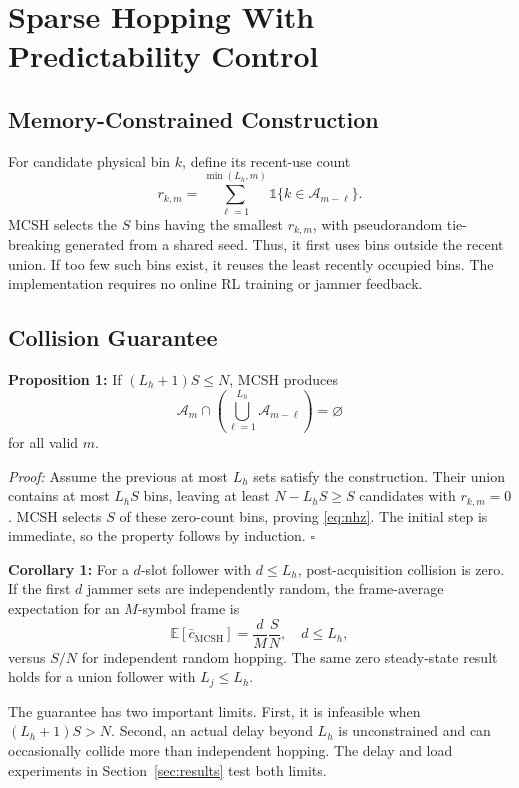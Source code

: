 \documentclass[journal,10pt]{IEEEtran}
\begin{document}
\section{Sparse Hopping With Predictability Control}
\subsection{Memory-Constrained Construction}
For candidate physical bin $k$, define its recent-use count
\begin{equation}
r_{k,m}=\sum_{\ell=1}^{\min(L_h,m)}
\mathds{1}\{k\in\mathcal{A}_{m-\ell}\}.
\label{eq:recent}
\end{equation}
MCSH selects the $S$ bins having the smallest $r_{k,m}$, with pseudorandom
tie-breaking generated from a shared seed. Thus, it first uses bins outside
the recent union. If too few such bins exist, it reuses the least recently
occupied bins. The implementation requires no online RL training or jammer
feedback.

\subsection{Collision Guarantee}
\textbf{Proposition 1:} If $(L_h+1)S\leq N$, MCSH produces
\begin{equation}
\mathcal{A}_m\cap
\left(\bigcup_{\ell=1}^{L_h}\mathcal{A}_{m-\ell}\right)=\varnothing
\label{eq:nhz}
\end{equation}
for all valid $m$.

\emph{Proof:} Assume the previous at most $L_h$ sets satisfy the construction.
Their union contains at most $L_hS$ bins, leaving at least
$N-L_hS\geq S$ candidates with $r_{k,m}=0$. MCSH selects $S$ of these
zero-count bins, proving \eqref{eq:nhz}. The initial step is immediate, so the
property follows by induction. \hfill$\square$

\textbf{Corollary 1:} For a $d$-slot follower with $d\leq L_h$, post-acquisition
collision is zero. If the first $d$ jammer sets are independently random, the
frame-average expectation for an $M$-symbol frame is
\begin{equation}
\mathbb{E}[\bar c_{\mathrm{MCSH}}]
=\frac{d}{M}\frac{S}{N},
\quad d\leq L_h,
\label{eq:frame_collision}
\end{equation}
versus $S/N$ for independent random hopping. The same zero steady-state result
holds for a union follower with $L_j\leq L_h$.

The guarantee has two important limits. First, it is infeasible when
$(L_h+1)S>N$. Second, an actual delay beyond $L_h$ is unconstrained and can
occasionally collide more than independent hopping. The delay and load
experiments in Section~\ref{sec:results} test both limits.
\end{document}

